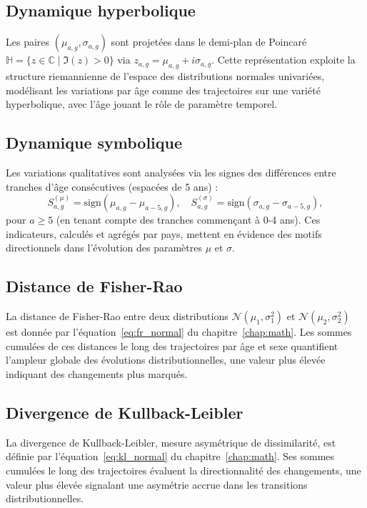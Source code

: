 \subsection{Dynamique hyperbolique}

Les paires $(\mu_{a,g}, \sigma_{a,g})$ sont projetées dans le demi-plan de Poincaré $\mathbb{H} = \{ z \in \mathbb{C} \mid \Im(z) > 0 \}$ via $z_{a,g} = \mu_{a,g} + i \sigma_{a,g}$. Cette représentation exploite la structure riemannienne de l'espace des distributions normales univariées, modélisant les variations par âge comme des trajectoires sur une variété hyperbolique, avec l'âge jouant le rôle de paramètre temporel.

\subsection{Dynamique symbolique}

Les variations qualitatives sont analysées via les signes des différences entre tranches d'âge consécutives (espacées de 5 ans) :
\[
S_{a,g}^{(\mu)} = \mathrm{sign} (\mu_{a,g} - \mu_{a-5,g}), \quad S_{a,g}^{(\sigma)} = \mathrm{sign}(\sigma_{a,g} - \sigma_{a-5,g}),
\]
pour $a \geq 5$ (en tenant compte des tranches commençant à 0-4 ans). Ces indicateurs, calculés et agrégés par pays, mettent en évidence des motifs directionnels dans l'évolution des paramètres $\mu$ et $\sigma$.

\subsection{Distance de Fisher-Rao}

La distance de Fisher-Rao entre deux distributions $\mathcal{N}(\mu_1, \sigma_1^2)$ et $\mathcal{N}(\mu_2, \sigma_2^2)$ est donnée par l'équation~\eqref{eq:fr_normal} du chapitre~\ref{chap:math}. Les sommes cumulées de ces distances le long des trajectoires par âge et sexe quantifient l'ampleur globale des évolutions distributionnelles, une valeur plus élevée indiquant des changements plus marqués.

\subsection{Divergence de Kullback-Leibler}

La divergence de Kullback-Leibler, mesure asymétrique de dissimilarité, est définie par l'équation~\eqref{eq:kl_normal} du chapitre~\ref{chap:math}. Ses sommes cumulées le long des trajectoires évaluent la directionnalité des changements, une valeur plus élevée signalant une asymétrie accrue dans les transitions distributionnelles.

